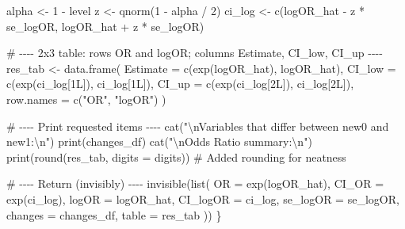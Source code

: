 \documentclass[
  letterpaper,
]{scrbook}
\newenvironment{Shaded}{\begin{snugshade}}{\end{snugshade}}
\newcommand{\AttributeTok}[1]{\textcolor[rgb]{0.40,0.45,0.13}{#1}}
\newcommand{\CommentTok}[1]{\textcolor[rgb]{0.37,0.37,0.37}{#1}}
\newcommand{\DecValTok}[1]{\textcolor[rgb]{0.68,0.00,0.00}{#1}}
\newcommand{\FunctionTok}[1]{\textcolor[rgb]{0.28,0.35,0.67}{#1}}
\newcommand{\NormalTok}[1]{\textcolor[rgb]{0.00,0.23,0.31}{#1}}
\newcommand{\OtherTok}[1]{\textcolor[rgb]{0.00,0.23,0.31}{#1}}
\newcommand{\SpecialCharTok}[1]{\textcolor[rgb]{0.37,0.37,0.37}{#1}}
\newcommand{\StringTok}[1]{\textcolor[rgb]{0.13,0.47,0.30}{#1}}
\begin{document}
\begin{Shaded}
\begin{Highlighting}[]
\NormalTok{  alpha  }\OtherTok{\textless{}{-}} \DecValTok{1} \SpecialCharTok{{-}}\NormalTok{ level}
\NormalTok{  z      }\OtherTok{\textless{}{-}} \FunctionTok{qnorm}\NormalTok{(}\DecValTok{1} \SpecialCharTok{{-}}\NormalTok{ alpha }\SpecialCharTok{/} \DecValTok{2}\NormalTok{)}
\NormalTok{  ci\_log }\OtherTok{\textless{}{-}} \FunctionTok{c}\NormalTok{(logOR\_hat }\SpecialCharTok{{-}}\NormalTok{ z }\SpecialCharTok{*}\NormalTok{ se\_logOR, logOR\_hat }\SpecialCharTok{+}\NormalTok{ z }\SpecialCharTok{*}\NormalTok{ se\_logOR)}

  \CommentTok{\# {-}{-}{-}{-} 2x3 table: rows OR and logOR; columns Estimate, CI\_low, CI\_up {-}{-}{-}{-}}
\NormalTok{  res\_tab }\OtherTok{\textless{}{-}} \FunctionTok{data.frame}\NormalTok{(}
    \AttributeTok{Estimate =} \FunctionTok{c}\NormalTok{(}\FunctionTok{exp}\NormalTok{(logOR\_hat),          logOR\_hat),}
    \AttributeTok{CI\_low   =} \FunctionTok{c}\NormalTok{(}\FunctionTok{exp}\NormalTok{(ci\_log[}\DecValTok{1}\NormalTok{L]),         ci\_log[}\DecValTok{1}\NormalTok{L]),}
    \AttributeTok{CI\_up    =} \FunctionTok{c}\NormalTok{(}\FunctionTok{exp}\NormalTok{(ci\_log[}\DecValTok{2}\NormalTok{L]),         ci\_log[}\DecValTok{2}\NormalTok{L]),}
    \AttributeTok{row.names =} \FunctionTok{c}\NormalTok{(}\StringTok{"OR"}\NormalTok{, }\StringTok{"logOR"}\NormalTok{)}
\NormalTok{  )}

  \CommentTok{\# {-}{-}{-}{-} Print requested items {-}{-}{-}{-}}
  \FunctionTok{cat}\NormalTok{(}\StringTok{"}\SpecialCharTok{\textbackslash{}n}\StringTok{Variables that differ between new0 and new1:}\SpecialCharTok{\textbackslash{}n}\StringTok{"}\NormalTok{)}
  \FunctionTok{print}\NormalTok{(changes\_df)}
  \FunctionTok{cat}\NormalTok{(}\StringTok{"}\SpecialCharTok{\textbackslash{}n}\StringTok{Odds Ratio summary:}\SpecialCharTok{\textbackslash{}n}\StringTok{"}\NormalTok{)}
  \FunctionTok{print}\NormalTok{(}\FunctionTok{round}\NormalTok{(res\_tab, }\AttributeTok{digits =}\NormalTok{ digits)) }\CommentTok{\# Added rounding for neatness}

  \CommentTok{\# {-}{-}{-}{-} Return (invisibly) {-}{-}{-}{-}}
  \FunctionTok{invisible}\NormalTok{(}\FunctionTok{list}\NormalTok{(}
    \AttributeTok{OR        =} \FunctionTok{exp}\NormalTok{(logOR\_hat),}
    \AttributeTok{CI\_OR     =} \FunctionTok{exp}\NormalTok{(ci\_log),}
    \AttributeTok{logOR     =}\NormalTok{ logOR\_hat,}
    \AttributeTok{CI\_logOR  =}\NormalTok{ ci\_log,}
    \AttributeTok{se\_logOR  =}\NormalTok{ se\_logOR,}
    \AttributeTok{changes   =}\NormalTok{ changes\_df,}
    \AttributeTok{table     =}\NormalTok{ res\_tab}
\NormalTok{  ))}
\NormalTok{\}}


\end{Highlighting}
\end{Shaded}
\end{document}
